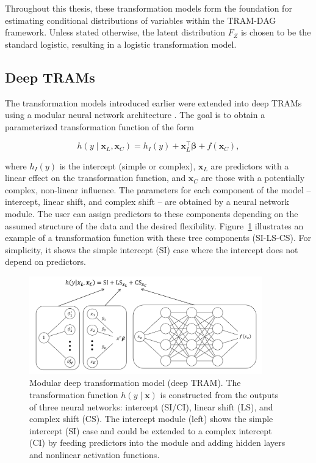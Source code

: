 Throughout this thesis, these transformation models form the foundation for estimating conditional distributions of variables within the TRAM-DAG framework. Unless stated otherwise, the latent distribution $F_Z$ is chosen to be the standard logistic, resulting in a logistic transformation model.



\subsection{Deep TRAMs} \label{sec:deep_trams}

The transformation models introduced earlier were extended into deep TRAMs using a modular neural network architecture \citep{sick2020}. The goal is to obtain a parameterized transformation function of the form

\begin{equation}
h(y \mid \mathbf{x}_L, \mathbf{x}_C ) = h_I(y) + \mathbf{x}_L^\top \boldsymbol{\beta} + f(\mathbf{x}_C),
\label{eq:deep_tram_old}
\end{equation}

where $h_I(y)$ is the intercept (simple or complex), $\mathbf{x}_{L}$ are predictors with a linear effect on the transformation function, and $\mathbf{x}_{C}$ are those with a potentially complex, non-linear influence. The parameters for each component of the model -- intercept, linear shift, and complex shift -- are obtained by a neural network module. The user can assign predictors to these components depending on the assumed structure of the data and the desired flexibility. Figure~\ref{fig:deep_tram} illustrates an example of a transformation function with these tree components (SI-LS-CS). For simplicity, it shows the simple intercept (SI) case where the intercept does not depend on predictors.


\begin{figure}[H]
\centering
\includegraphics[width=0.9\textwidth]{img/deep_tram.png}
\caption{Modular deep transformation model (deep TRAM). The transformation function $h(y \mid \mathbf{x})$ is constructed from the outputs of three neural networks: intercept (SI/CI), linear shift (LS), and complex shift (CS). The intercept module (left) shows the simple intercept (SI) case and could be extended to a complex intercept (CI) by feeding predictors into the module and adding hidden layers and nonlinear activation functions.}
\label{fig:deep_tram}
\end{figure}


